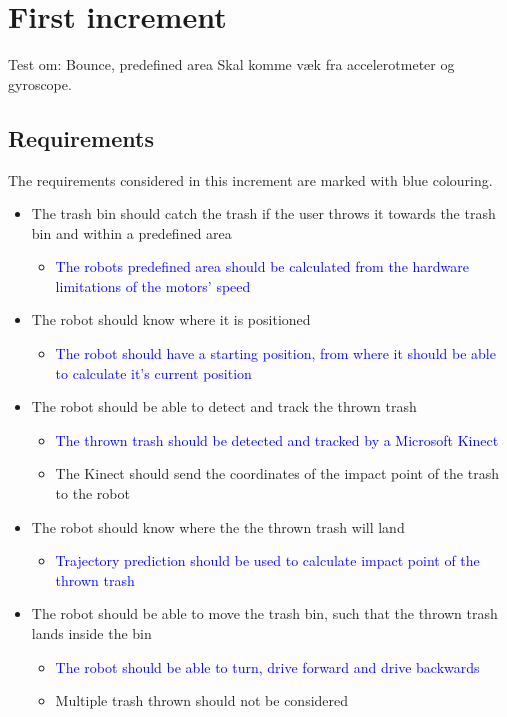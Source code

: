 \chapter{First increment}
\label{chap:First Increment}
Test om: Bounce, predefined area
Skal komme væk fra accelerotmeter og gyroscope. 

\section{Requirements}
\label{sec:i1Requirements}
The requirements considered in this increment are marked with blue colouring.

\begin{itemize}
\item The trash bin should catch the trash if the user throws it towards the trash bin and within a predefined area
\begin{itemize}
\item \textcolor{blue}{The robots predefined area should be calculated from the hardware limitations of the motors’ speed}
\end{itemize}
\item The robot should know where it is positioned
\begin{itemize}
\item \textcolor{blue}{The robot should have a starting position, from where it should be able to calculate it's current position}
\end{itemize}
\item The robot should be able to detect and track the thrown trash
\begin{itemize}
\item \textcolor{blue}{The thrown trash should be detected and tracked by a Microsoft Kinect}
\item The Kinect should send the coordinates of the impact point of the trash to the robot
\end{itemize}
\item The robot should know where the the thrown trash will land
\begin{itemize}
\item \textcolor{blue}{Trajectory prediction should be used to calculate impact point of the thrown trash}
\end{itemize}
\item The robot should be able to move the trash bin, such that the thrown trash lands inside the bin
\begin{itemize}
\item \textcolor{blue}{The robot should be able to turn, drive forward and drive backwards}
\item Multiple trash thrown should not be considered
\end{itemize}
\end{itemize}

